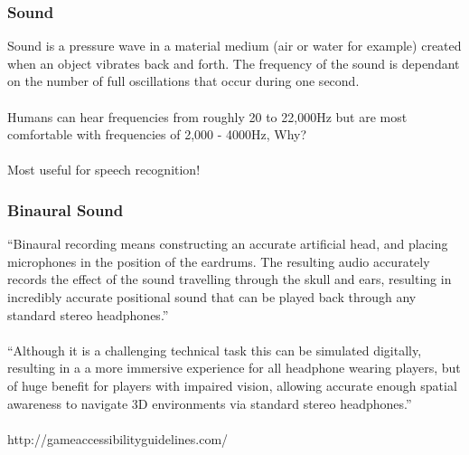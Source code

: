 \begin{frame}
	\frametitle{Sound}
	
	Sound is a pressure wave in a material medium (air or water for example) created when an object vibrates back and forth. The frequency of the sound is dependant on the number of full oscillations that occur during one second. 
	\\~\\
	Humans can hear frequencies from roughly 20 to 22,000Hz but are most comfortable with frequencies of 2,000 - 4000Hz, Why? \pause
	\\~\\
	Most useful for speech recognition!

\end{frame}

\begin{frame}
	\frametitle{Binaural Sound}
	``Binaural recording means constructing an accurate artificial head, and placing microphones in the position of the eardrums. The resulting audio accurately records the effect of the sound travelling through the skull and ears, resulting in incredibly accurate positional sound that can be played back through any standard stereo headphones.''
	\\~\\
``Although it is a challenging technical task this can be simulated digitally, resulting in a a more immersive experience for all headphone wearing players, but of huge benefit for players with impaired vision, allowing accurate enough spatial awareness to navigate 3D environments via standard stereo headphones.'' \\~\\
	\tiny{http://gameaccessibilityguidelines.com/}
\end{frame}

